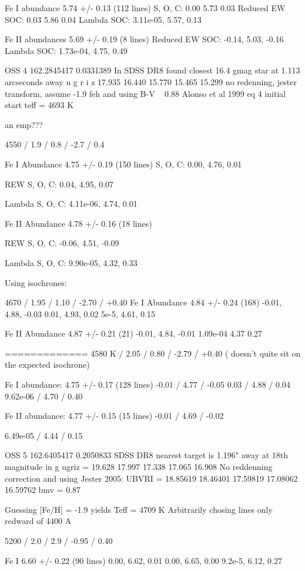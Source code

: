 \documentclass{emulateapj}
\begin{document}
Fe I abundance 5.74 +/- 0.13 (112 lines)
S, O, C: 0.00 5.73 0.03
Reduced EW SOC: 0.03 5.86 0.04
Lambda SOC: 3.11e-05, 5.57, 0.13

Fe II abundances 5.69 +/- 0.19 (8 lines)
Reduced EW SOC: -0.14, 5.03, -0.16
Lambda SOC: 1.73e-04, 4.75, 0.49



OSS 4
162.2845417 0.0331389
In SDSS DR8 found closest 16.4 gmag star at 1.113 arcseconds away
u g r i z
17.935 16.440 15.770 15.465 15.299
no redenning, jester transform, assume -1.9 feh and using B-V ~ 0.88
Alonso et al 1999 eq 4
initial start teff = 4693 K

an emp???

4550 /  1.9 / 0.8 / -2.7 / 0.4

Fe I Abundance 4.75 +/- 0.19 (150 lines)
S, O, C: 0.00, 4.76, 0.01

REW S, O, C: 0.04, 4.95, 0.07

Lambda S, O, C: 4.11e-06, 4.74, 0.01

Fe II Abundance 4.78 +/- 0.16 (18 lines)

REW S, O, C: -0.06, 4.51, -0.09

Lambda S, O, C: 9.90e-05, 4.32, 0.33

Using isochrones:

4670 / 1.95 / 1.10 / -2.70 / +0.40
Fe I Abundance 4.84 +/- 0.24 (168)
-0.01, 4.88, -0.03
0.01, 4.93, 0.02
5e-5, 4.61, 0.15

Fe II Abundance 4.87 +/- 0.21 (21)
-0.01, 4.84, -0.01
1.09e-04 4.37 0.27

=============
4580 K / 2.05 / 0.80 / -2.79 / +0.40
( doesn't quite sit on the expected isochrone)

Fe I abundance: 4.75 +/- 0.17 (128 lines)
-0.01 / 4.77 / -0.05
0.03 / 4.88 / 0.04
9.62e-06 / 4.70 / 0.40

Fe II abundance: 4.77 +/- 0.15 (15 lines)
-0.01 / 4.69 / -0.02

6.49e-05 / 4.44 / 0.15

OSS 5
162.6405417 0.2050833
SDSS DR8 nearest target is 1.196" away at 18th magnitude in g
ugriz = 19.628 17.997 17.338 17.065 16.908
No reddenning correction and using Jester 2005:
UBVRI = 18.85619 18.46401 17.59819 17.08062 16.59762
bmv = 0.87

Guessing [Fe/H] = -1.9 yields Teff = 4709 K
Arbitrarily chosing lines only redward of 4400 A

5200 / 2.0 / 2.9 / -0.95 / 0.40

Fe I 6.60 +/- 0.22 (90 lines)
0.00, 6.62, 0.01
0.00, 6.65, 0.00
9.2e-5, 6.12, 0.27
\end{document}
